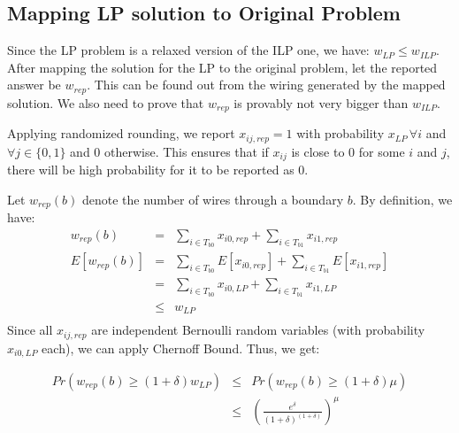 \subsection{Mapping LP solution to Original Problem }
Since the LP problem is a relaxed version of the ILP one, we have: $w_{LP} \leq w_{ILP}$. After mapping the solution for the LP to the original problem, let the reported answer be $w_{rep}$. This can be found out from the wiring generated by the mapped solution. We also need to prove that $w_{rep}$ is provably not very bigger than $w_{ILP}$.

Applying randomized rounding, we report $x_{ij,rep} = 1$ with probability $x_{LP}\, \forall i$ and $\forall j \in\{0,1\}$ and 0 otherwise. This ensures that if $x_{ij}$ is close to 0 for some $i$ and $j$, there will be high probability for it to be reported as 0.

Let $w_{rep}(b)$ denote the number of wires through a boundary $b$. By definition, we have:
\[
	\begin{array}{rcl}
	w_{rep}(b) & = & \sum\limits_{i \in T_{b0}} x_{i0,rep} + \sum\limits_{i \in T_{b1}} x_{i1,rep}\\
	E[w_{rep}(b)] & = & \sum\limits_{i \in T_{b0}} E[x_{i0,rep}] + \sum\limits_{i \in T_{b1}} E[x_{i1,rep}] \\
	& = & \sum\limits_{i \in T_{b0}} x_{i0,LP} + \sum\limits_{i \in T_{b1}} x_{i1,LP} \\
	& \leq & w_{LP}\\
	\end{array}
\]
Since all $ x_{ij,rep}$ are independent Bernoulli random variables (with probability $ x_{i0,LP}$ each), we can apply Chernoff Bound. Thus, we get:

\[
	\begin{array}{rcl}
	Pr(w_{rep}(b)\geq (1+\delta)w_{LP}) & \leq & Pr(w_{rep}(b) \geq (1+\delta) \mu)\\
	& \leq & \left(\frac{e^\delta}{(1+\delta)^{(1+\delta)}}\right)^\mu\\
	\end{array}
\]

